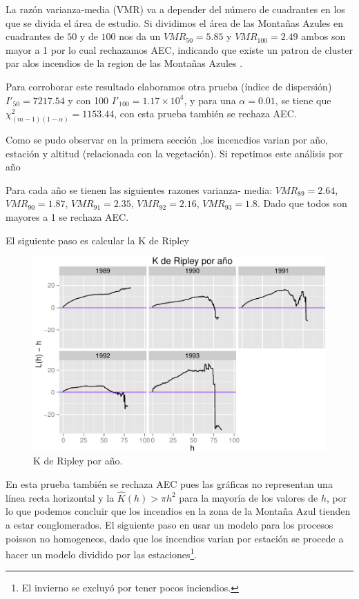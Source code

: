 \documentclass[12,]{article}
\let\rmarkdownfootnote\footnote%
\def\footnote{\protect\rmarkdownfootnote}
\begin{document}
La razón varianza-media (VMR) va a depender del número de cuadrantes en
los que se divida el área de estudio. Si dividimos el área de las
Montañas Azules en cuadrantes de $50$ y de $100$ nos da un
$VMR_{50} = 5.85$ y $VMR_{100} = 2.49$ ambos son mayor a 1 por lo cual
rechazamos AEC, indicando que existe un patron de cluster par alos
incendios de la region de las Montañas Azules .

Para corroborar este resultado elaboramos otra prueba (índice de
dispersión) $I'_{50} = 7217.54$ y con 100
$I'_{100} = 1.17\times 10^{4}$, y para una $\alpha = 0.01$, se tiene que
$\chi^2_{(m-1)(1 - \alpha)} = 1153.44$, con esta prueba también se
rechaza AEC.

Como se pudo observar en la primera sección ,los incencdios varian por
año, estación y altitud (relacionada con la vegetación). Si repetimos
este análisis por año

Para cada año se tienen las siguientes razones varianza- media:
$VMR_{89} = 2.64$, $VMR_{90} = 1.87$, $VMR_{91} = 2.35$,
$VMR_{92} = 2.16$, $VMR_{93} = 1.8$. Dado que todos son mayores a 1 se
rechaza AEC.

El siguiente paso es calcular la K de Ripley

\begin{figure}[htbp]
\centering
\includegraphics{tarea2_files/figure-latex/unnamed-chunk-14-1.pdf}
\caption{K de Ripley por año.}
\end{figure}

En esta prueba también se rechaza AEC pues las gráficas no representan
una línea recta horizontal y la $\hat{K}(h) > \pi h^2$ para la mayoría
de los valores de $h$, por lo que podemos concluir que los incendios en
la zona de la Montaña Azul tienden a estar conglomerados. El siguiente
paso en usar un modelo para los procesos poisson no homogeneos, dado que
los incendios varian por estación se procede a hacer un modelo dividido
por las estaciones\footnote{El invierno se excluyó por tener pocos
  inciendios.}.
\end{document}
